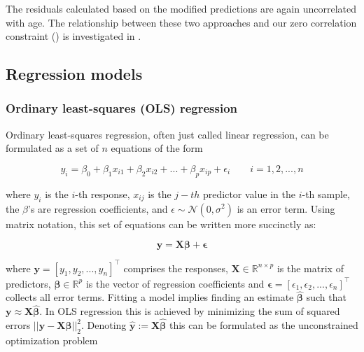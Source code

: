 \documentclass[utf8]{frontiersSCNS} %
\renewcommand{\a}{\theta}
\renewcommand{\b}{\boldsymbol{\beta}} %
\newcommand{\bh}{\boldsymbol{\hat{\beta}}} %
\newcommand{\eps}{\boldsymbol{\epsilon}}
\newcommand{\N}{\mathcal{N}}   %
\newcommand{\R}{\mathbb{R}}
\newcommand{\X}{\mathbf{X}}
\newcommand{\y}{\mathbf{y}}
\newcommand{\yh}{\mathbf{\hat{y}}}
\begin{document}
The residuals calculated based on the modified predictions are again uncorrelated with age. The relationship between these two approaches and our zero correlation constraint () is investigated in .


\subsection{Regression models}\label{sec:regression_models}

\subsubsection{Ordinary least-squares (OLS) regression}

Ordinary least-squares regression, often just called linear regression, can be formulated as a set of $n$ equations of the form

\[
y_i = \beta_0 + \beta_1 x_{i1}+ \beta_2 x_{i2} + ... + \beta_p x_{ip} + \epsilon_i\quad\quad i=1, 2, ..., n
\]

where $y_i$ is the $i$-th response, $x_{ij}$ is the $j-th$ predictor value in the $i$-th sample, the $\beta$'s are regression coefficients, and  $\epsilon\sim\N(0,\sigma^2)$ is an error term. Using matrix notation, this set of equations can be written more succinctly as:

\begin{equation}\label{eq:linear_regression}
\y = \X\b + \eps
\end{equation}

where $\y=[y_1, y_2, ..., y_n]^\top$ comprises the responses, $\X\in\R^{n\times p}$ is the matrix of predictors, $\b\in\R^p$ is the vector of regression coefficients and 
$\eps=[\epsilon_1,\epsilon_2,...,\epsilon_n]^\top$ collects all error terms. Fitting a model implies finding an estimate $\bh$ such that $\y\approx\X\bh$. In OLS regression this is achieved by minimizing the sum of squared errors $||\y-\X\b||_2^2$. Denoting $\yh := \X\bh$ this can be formulated as the unconstrained optimization problem
\end{document}
